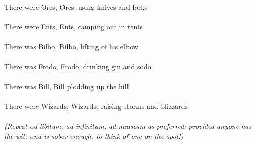 \begin{multicols}{2}
There were Orcs, Orcs, using knives and forks
\\
\\
There were Ents, Ents, camping out in tents
\\
\\
There was Bilbo, Bilbo, lifting of his elbow
\\
\\
There was Frodo, Frodo, drinking gin and sodo
\\
\\
There was Bill, Bill plodding up the hill
\\
\\
There were Wizards, Wizards, raising storms and blizzards
\\
\\
\textit{(Repeat ad libitum, ad infinitum, ad nauseam as preferred: provided anyone has the wit, and is sober enough, to think of one on the spot!)}

\end{multicols}